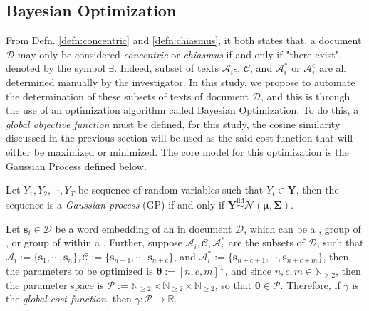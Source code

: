 \subsection{Bayesian Optimization}
From Defn. \ref{defn:concentric} and \ref{defn:chiasmus}, it both states that, a document $\mathscr{D}$ may only be considered \textit{concentric} or \textit{chiasmus} if and only if "there exist", denoted by the symbol $\exists$. Indeed, subset of texts $\mathscr{A}_i$s, $\mathscr{C}$, and $\mathscr{A}_i^{*}$ or $\mathscr{A}_i^{\text{c}}$ are all determined manually by the investigator. In this study, we propose to automate the determination of these subsets of texts of document $\mathscr{D}$, and this is through the use of an optimization algorithm called Bayesian Optimization. To do this, a \textit{global objective function} must be defined, for this study, the cosine similarity discussed in the previous section will be used as the said cost function that will either be maximized or minimized. The core model for this optimization is the Gaussian Process defined below.
\begin{defnx}\label{def:gp}
    Let $Y_1,Y_2,\cdots,Y_T$ be sequence of random variables such that $Y_t\in\mathbf{Y}$, then the sequence is a \textit{Gaussian process} (GP) if and only if $\mathbf{Y}\overset{\mathrm{iid}}{\sim}\mathcal{N}(\boldsymbol{\mu}, \boldsymbol{\Sigma})$.
\end{defnx}
\begin{defnx}\label{def:global_cost_func}
    Let $\mathbf{s}_i\in\mathscr{D}$ be a word embedding of an   in document $\mathscr{D}$, which can be a  , group of  , or group of   within a  . Further, suppose $\mathscr{A}_i,\mathscr{C},\mathscr{A}_i^{*}$ are the subsets of $\mathscr{D}$, such that $\mathscr{A}_i:=\{\mathbf{s}_1,\cdots,\mathbf{s}_n\}, \mathscr{C}:=\{\mathbf{s}_{n+1},\cdots,\mathbf{s}_{n+c}\}$, and $\mathscr{A}_i^{*}:=\{\mathbf{s}_{n+c+1},\cdots,\mathbf{s}_{n+c+m}\}$, then the parameters to be optimized is $\boldsymbol{\theta}:=[n,c,m]^{\text{T}}$, and since $n,c,m\in\mathbb{N}_{\geq 2}$, then the parameter space is $\mathscr{P}:=\mathbb{N}_{\geq 2}\times\mathbb{N}_{\geq 2}\times\mathbb{N}_{\geq 2}$, so that $\boldsymbol{\theta}\in\mathscr{P}$. Therefore, if $\gamma$ is the \textit{global cost function}, then $\gamma:\mathscr{P}\rightarrow\mathbb{R}$.
\end{defnx}
